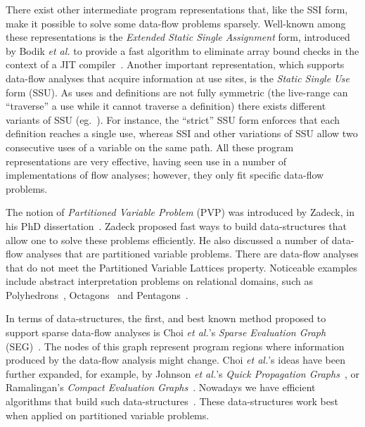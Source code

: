 There exist other intermediate program representations that, like the SSI form, make it possible to solve some data-flow problems sparsely.
Well-known among these representations is the {\em Extended Static Single Assignment} form, introduced by Bodik {\em et al.} to provide a fast algorithm to eliminate array bound checks in the context of a JIT compiler~\cite{Bodik00}.
Another important representation, which supports data-flow analyses that acquire information at use sites, is the \emph{Static Single Use} form (SSU).
As uses and definitions are not fully symmetric (the live-range can ``traverse'' a use while it cannot traverse a definition) there exists different variants of SSU (eg.~\cite{Plevyak96,George03-IXP,Lo98_registerPromotion}).
For instance, the ``strict'' SSU form enforces that each definition reaches a
single use, whereas SSI and other variations of SSU allow two consecutive uses
of a variable on the same path.
All these program representations are very effective, having seen use in a number of implementations of flow analyses; however, they only fit specific data-flow problems.

The notion of {\em Partitioned Variable Problem} (PVP) was introduced by Zadeck, in his PhD dissertation~\cite{Zadeck84}.
Zadeck proposed fast ways to build data-structures that allow one to solve these problems efficiently.
He also discussed a number of data-flow analyses that are partitioned variable problems.
There are data-flow analyses that do not meet the Partitioned Variable Lattices property.
Noticeable examples include abstract interpretation problems on relational domains, such as Polyhedrons~\cite{Cousot78}, Octagons~\cite{Mine06} and Pentagons~\cite{Logozzo08}.

In terms of data-structures, the first, and best known method proposed to support sparse data-flow analyses is Choi {\em et al.}'s {\em Sparse Evaluation Graph} (SEG)~\cite{Choi91}.
The nodes of this graph represent program regions where information produced by the data-flow analysis might change.
Choi {\em et al.}'s ideas have been further expanded, for example, by Johnson {\em et al.}'s {\em Quick Propagation Graphs}~\cite{Johnson93}, or Ramalingan's {\em Compact Evaluation Graphs}~\cite{Ramalingan02}.
Nowadays we have efficient algorithms that build such data-structures~\cite{Pingali95,Pingali97,Johnson94}.
These data-structures work best when applied on partitioned variable problems.

